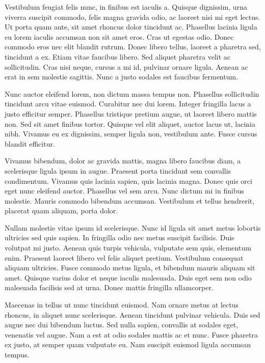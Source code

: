 Vestibulum feugiat felis nunc, in finibus est iaculis a. Quisque dignissim, urna viverra suscipit commodo, felis magna gravida odio, ac laoreet nisi mi eget lectus. Ut porta quam ante, sit amet rhoncus dolor tincidunt ac. Phasellus lacinia ligula eu lorem iaculis accumsan non sit amet eros. Cras ut egestas odio. Donec commodo eros nec elit blandit rutrum. Donec libero tellus, laoreet a pharetra sed, tincidunt a ex. Etiam vitae faucibus libero. Sed aliquet pharetra velit ac sollicitudin. Cras nisi neque, cursus a mi id, pulvinar ornare ligula. Aenean ac erat in sem molestie sagittis. Nunc a justo sodales est faucibus fermentum.

Nunc auctor eleifend lorem, non dictum massa tempus non. Phasellus sollicitudin tincidunt arcu vitae euismod. Curabitur nec dui lorem. Integer fringilla lacus a justo efficitur semper. Phasellus tristique pretium augue, ut laoreet libero mattis non. Sed sit amet finibus tortor. Quisque vel elit aliquet, auctor lacus ut, lacinia nibh. Vivamus eu ex dignissim, semper ligula non, vestibulum ante. Fusce cursus blandit efficitur.

Vivamus bibendum, dolor ac gravida mattis, magna libero faucibus diam, a scelerisque ligula ipsum in augue. Praesent porta tincidunt sem convallis condimentum. Vivamus quis lacinia sapien, quis lacinia magna. Donec quis orci eget nunc eleifend auctor. Phasellus vel sem arcu. Nunc dictum mi in finibus molestie. Mauris commodo bibendum accumsan. Vestibulum et tellus hendrerit, placerat quam aliquam, porta dolor.

Nullam molestie vitae ipsum id scelerisque. Nunc id ligula sit amet metus lobortis ultricies sed quis sapien. In fringilla odio nec metus suscipit facilisis. Duis volutpat mi justo. Aenean quis turpis vehicula, vulputate sem quis, elementum enim. Praesent laoreet libero vel felis aliquet pretium. Vestibulum consequat aliquam ultricies. Fusce commodo metus ligula, et bibendum mauris aliquam sit amet. Quisque varius dolor et neque iaculis malesuada. Duis eget sem non odio malesuada facilisis sed at urna. Donec mattis fringilla ullamcorper.

Maecenas in tellus ut nunc tincidunt euismod. Nam ornare metus at lectus rhoncus, in aliquet nunc scelerisque. Aenean tincidunt pulvinar vehicula. Duis sed augue nec dui bibendum luctus. Sed nulla sapien, convallis at sodales eget, venenatis vel augue. Nam a est at odio sodales mattis ac et nunc. Fusce pharetra ex justo, at semper quam vulputate eu. Nam suscipit euismod ligula accumsan tempus.

